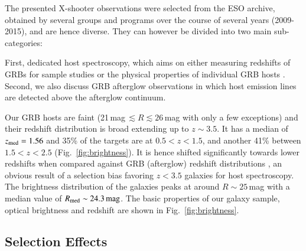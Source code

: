 \documentclass[traditabstract, longauth]{aa}
\begin{document}
The presented X-shooter observations were selected from the ESO archive, obtained by several groups and programs over the course of several years (2009-2015), and are hence diverse. They can however be divided into two main sub-categories: 

First, dedicated host spectroscopy, which aims on either measuring redshifts of GRBs for sample studies \citep[e.g.,][]{2012ApJ...758...46K, 2012ApJ...749...68S} or the physical properties of individual GRB hosts \citep[e.g.,][]{2011A&A...535A.127V, 2012A&A...546A...8K}. Second, we also discuss GRB afterglow observations in which host emission lines are detected above the afterglow continuum. 

Our GRB hosts are faint (21\,mag\,$\lesssim R\lesssim 26$\,mag with only a few exceptions) and their redshift distribution is broad extending up to $z\sim3.5$. It has a median of $z_{\rm{med}}=1.56$ and 35\% of the targets are at $0.5<z<1.5$, and another 41\% between $1.5<z<2.5$ (Fig.~\ref{fig:brightness}). {It is hence shifted significantly towards lower redshifts when compared against GRB (afterglow) redshift distributions \citep[][]{2011A&A...526A..30G, 2012ApJ...752...62J, 2012ApJ...749...68S, 2015arXiv150402482P}, an obvious result of a selection bias favoring $z<3.5$ galaxies for host spectroscopy. The brightness distribution of the galaxies peaks at around $R\sim25\,$mag with a median value of $R_{\rm med}\sim24.3\,\rm{mag}$. The basic properties of our galaxy sample, optical brightness and redshift are shown in Fig.~\ref{fig:brightness}.}

\subsection{Selection Effects}
\label{sec:seleffects}
\end{document}

